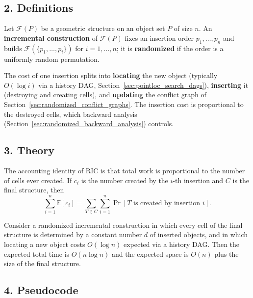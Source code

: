 \subsection{2. Definitions}

\begin{definition}\label{def:rand_incremental_construction}
  Let $\mathcal{F}(P)$ be a geometric structure on an object set $P$ of size
  $n$. An \textbf{incremental construction} of $\mathcal{F}(P)$ fixes an
  insertion order $p_1, \dots, p_n$ and builds
  $\mathcal{F}(\{p_1,\dots,p_i\})$ for $i = 1, \dots, n$; it is
  \textbf{randomized} if the order is a uniformly random permutation.
\end{definition}

The cost of one insertion splits into \textbf{locating} the new object
(typically $O(\log i)$ via a history DAG, Section~\ref{sec:pointloc_search_dags}),
\textbf{inserting} it (destroying and creating cells), and \textbf{updating} the
conflict graph of Section~\ref{sec:randomized_conflict_graphs}. The insertion
cost is proportional to the destroyed cells, which backward analysis
(Section~\ref{sec:randomized_backward_analysis}) controls.

\subsection{3. Theory}

The accounting identity of RIC is that total work is proportional to the number
of cells ever created. If $c_i$ is the number created by the $i$-th insertion
and $C$ is the final structure, then
\[
  \sum_{i=1}^{n} \mathbb{E}[c_i]
  = \sum_{T \in C} \sum_{i=1}^{n} \Pr[\text{$T$ is created by insertion $i$}].
\]

\begin{theorem}\label{thm:rand_ric_expected}
  Consider a randomized incremental construction in which every cell of the
  final structure is determined by a constant number $d$ of inserted objects,
  and in which locating a new object costs $O(\log n)$ expected via a history
  DAG. Then the expected total time is $O(n \log n)$ and the expected space is
  $O(n)$ plus the size of the final structure.
\end{theorem}

\subsection{4. Pseudocode}

